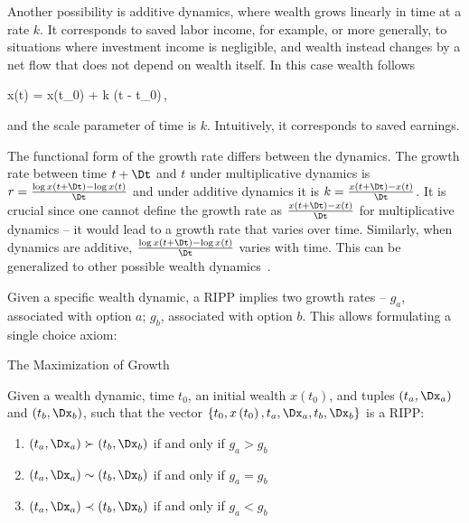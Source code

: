 Another possibility is additive dynamics, where wealth grows linearly in time at a rate $k$. It corresponds to saved labor income, for example, or more generally, to situations where investment income is negligible, and wealth instead changes by a net flow that does not depend on wealth itself. In this case wealth follows

\be
x\left(t\right) = x\left(t_0\right) + k \left(t - t_0\right)\,,
\ee

and the scale parameter of time is $k$. Intuitively, it corresponds to saved earnings.

The functional form of the growth rate differs between the dynamics. The growth rate between time $t+\Dt$ and $t$ under multiplicative dynamics is $r = \frac{\log x(t+\Dt)-\log x(t)}{\Dt}$ and under additive dynamics it is $k = \frac{x\left(t+\Dt\right)-x\left(t\right)}{\Dt}$. It is crucial since one cannot define the growth rate as $\frac{x\left(t+\Dt\right)-x\left(t\right)}{\Dt}$ for multiplicative dynamics -- it would lead to a growth rate that varies over time. Similarly, when dynamics are additive, $\frac{\log x(t+\Dt)-\log x(t)}{\Dt}$ varies with time. This can be generalized to other possible wealth dynamics~\citep{PetersGell-Mann2016,PetersAdamou2018a}.

Given a specific wealth dynamic, a RIPP implies two growth rates -- $g_a$, associated with option $a$; $g_b$, associated with option $b$. This allows formulating a single choice axiom:

\begin{axiom}{The Maximization of Growth}

Given a wealth dynamic, time $t_0$, an initial wealth $x\left(t_0\right)$, and tuples $\left(t_a,\Dx_a\right)$ and $\left(t_b,\Dx_b\right)$, such that the vector $\{t_0,x\left(t_0\right),t_a,\Dx_a,t_b,\Dx_b\}$ is a RIPP:

\begin{enumerate}
\item $\left(t_a,\Dx_a\right) \succ \left(t_b,\Dx_b\right)$ if and only if $g_a > g_b$
\item $\left(t_a,\Dx_a\right) \sim \left(t_b,\Dx_b\right)$ if and only if $g_a = g_b$
\item $\left(t_a,\Dx_a\right) \prec \left(t_b,\Dx_b\right)$ if and only if $g_a < g_b$
\end{enumerate}
\label{ax:ax1}
\end{axiom}

